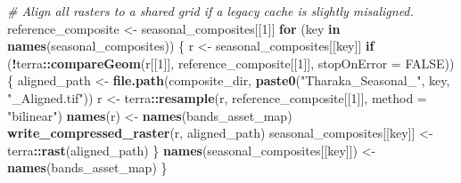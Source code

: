 \documentclass[
]{article}
\newenvironment{Shaded}{\begin{snugshade}}{\end{snugshade}}
\newcommand{\AttributeTok}[1]{\textcolor[rgb]{0.13,0.29,0.53}{#1}}
\newcommand{\CommentTok}[1]{\textcolor[rgb]{0.56,0.35,0.01}{\textit{#1}}}
\newcommand{\ConstantTok}[1]{\textcolor[rgb]{0.56,0.35,0.01}{#1}}
\newcommand{\ControlFlowTok}[1]{\textcolor[rgb]{0.13,0.29,0.53}{\textbf{#1}}}
\newcommand{\DecValTok}[1]{\textcolor[rgb]{0.00,0.00,0.81}{#1}}
\newcommand{\FunctionTok}[1]{\textcolor[rgb]{0.13,0.29,0.53}{\textbf{#1}}}
\newcommand{\NormalTok}[1]{#1}
\newcommand{\OtherTok}[1]{\textcolor[rgb]{0.56,0.35,0.01}{#1}}
\newcommand{\SpecialCharTok}[1]{\textcolor[rgb]{0.81,0.36,0.00}{\textbf{#1}}}
\newcommand{\StringTok}[1]{\textcolor[rgb]{0.31,0.60,0.02}{#1}}
\begin{document}
\begin{Shaded}
\begin{Highlighting}[]
\CommentTok{\# Align all rasters to a shared grid if a legacy cache is slightly misaligned.}
\NormalTok{reference\_composite }\OtherTok{\textless{}{-}}\NormalTok{ seasonal\_composites[[}\DecValTok{1}\NormalTok{]]}
\ControlFlowTok{for}\NormalTok{ (key }\ControlFlowTok{in} \FunctionTok{names}\NormalTok{(seasonal\_composites)) \{}
\NormalTok{  r }\OtherTok{\textless{}{-}}\NormalTok{ seasonal\_composites[[key]]}
  \ControlFlowTok{if}\NormalTok{ (}\SpecialCharTok{!}\NormalTok{terra}\SpecialCharTok{::}\FunctionTok{compareGeom}\NormalTok{(r[[}\DecValTok{1}\NormalTok{]], reference\_composite[[}\DecValTok{1}\NormalTok{]], }\AttributeTok{stopOnError =} \ConstantTok{FALSE}\NormalTok{)) \{}
\NormalTok{    aligned\_path }\OtherTok{\textless{}{-}} \FunctionTok{file.path}\NormalTok{(composite\_dir, }\FunctionTok{paste0}\NormalTok{(}\StringTok{"Tharaka\_Seasonal\_"}\NormalTok{, key, }\StringTok{"\_Aligned.tif"}\NormalTok{))}
\NormalTok{    r }\OtherTok{\textless{}{-}}\NormalTok{ terra}\SpecialCharTok{::}\FunctionTok{resample}\NormalTok{(r, reference\_composite[[}\DecValTok{1}\NormalTok{]], }\AttributeTok{method =} \StringTok{"bilinear"}\NormalTok{)}
    \FunctionTok{names}\NormalTok{(r) }\OtherTok{\textless{}{-}} \FunctionTok{names}\NormalTok{(bands\_asset\_map)}
    \FunctionTok{write\_compressed\_raster}\NormalTok{(r, aligned\_path)}
\NormalTok{    seasonal\_composites[[key]] }\OtherTok{\textless{}{-}}\NormalTok{ terra}\SpecialCharTok{::}\FunctionTok{rast}\NormalTok{(aligned\_path)}
\NormalTok{  \}}
  \FunctionTok{names}\NormalTok{(seasonal\_composites[[key]]) }\OtherTok{\textless{}{-}} \FunctionTok{names}\NormalTok{(bands\_asset\_map)}
\NormalTok{\}}


\end{Highlighting}
\end{Shaded}
\end{document}
